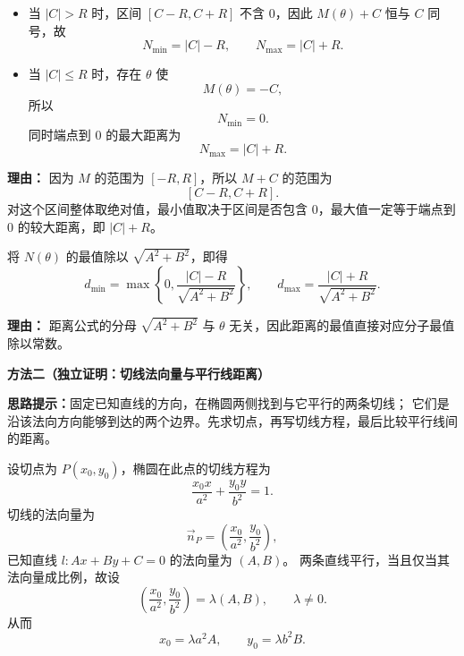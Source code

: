 \begin{proofbox}
\begin{description}[style=nextline, leftmargin=2.8em, labelsep=0.5em, itemsep=0.55em]
		      \begin{itemize}[leftmargin=*]
			      \item 当 \(|C|>R\) 时，区间 \([C-R,C+R]\) 不含 \(0\)，因此 \(M(\theta)+C\) 恒与 \(C\) 同号，故
			            \[
				            N_{\min}=|C|-R,
				            \qquad
				            N_{\max}=|C|+R.
			            \]

			      \item 当 \(|C|\le R\) 时，存在 \(\theta\) 使
			            \[
				            M(\theta)=-C,
			            \]
			            所以
			            \[
				            N_{\min}=0.
			            \]
			            同时端点到 \(0\) 的最大距离为
			            \[
				            N_{\max}=|C|+R.
			            \]
		      \end{itemize}

		      \par\textbf{理由：}
		      因为 \(M\) 的范围为 \([-R,R]\)，所以 \(M+C\) 的范围为
		      \[
			      [C-R,C+R].
		      \]
		      对这个区间整体取绝对值，最小值取决于区间是否包含 \(0\)，最大值一定等于端点到 \(0\) 的较大距离，即 \(|C|+R\)。

		\item[\textbf{步骤四（回归距离公式）：}]
		      将 \(N(\theta)\) 的最值除以 \(\sqrt{A^2+B^2}\)，即得
		      \[
			      d_{\min}
			      =
			      \max\left\{0,\frac{|C|-R}{\sqrt{A^2+B^2}}\right\},
			      \qquad
			      d_{\max}
			      =
			      \frac{|C|+R}{\sqrt{A^2+B^2}}.
		      \]

		      \par\textbf{理由：}
		      距离公式的分母 \(\sqrt{A^2+B^2}\) 与 \(\theta\) 无关，因此距离的最值直接对应分子最值除以常数。
	\end{description}

	\medskip

	\textbf{\textcolor{CProof}{方法二（独立证明：切线法向量与平行线距离）}}

	\textbf{思路提示：}固定已知直线的方向，在椭圆两侧找到与它平行的两条切线；
	它们是沿该法向方向能够到达的两个边界。先求切点，再写切线方程，最后比较平行线间的距离。

	\begin{description}[style=nextline, leftmargin=2.8em, labelsep=0.5em, itemsep=0.55em]
		\item[\textbf{步骤一（让切线的法向量与已知直线同向或反向）：}]
		      设切点为 \(P(x_0,y_0)\)，椭圆在此点的切线方程为
		      \[
			      \frac{x_0x}{a^2}+\frac{y_0y}{b^2}=1.
		      \]
		      切线的法向量为
		      \[
			      \vec n_P=\left(\frac{x_0}{a^2},\frac{y_0}{b^2}\right),
		      \]
		      已知直线 \(l:Ax+By+C=0\) 的法向量为 \((A,B)\)。
		      两条直线平行，当且仅当其法向量成比例，故设
		      \[
			      \left(\frac{x_0}{a^2},\frac{y_0}{b^2}\right)
			      =\lambda(A,B),\qquad \lambda\ne 0.
		      \]
		      从而
		      \[
			      x_0=\lambda a^2A,\qquad y_0=\lambda b^2B.
		      \]


\end{description}
\end{proofbox}
